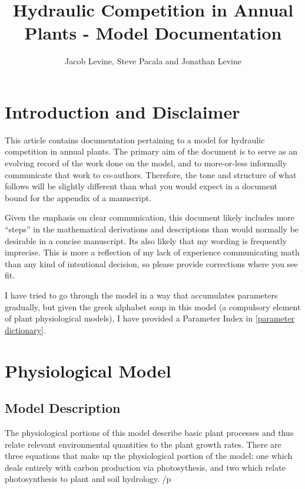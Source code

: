 \documentclass{article}
\title{Hydraulic Competition in Annual Plants - Model Documentation}
\author{Jacob Levine, Steve Pacala and Jonathan Levine}
\date{}
\begin{document}
\maketitle

  \tableofcontents

  \section{Introduction and Disclaimer}

  This article contains documentation pertaining to a model for hydraulic
  competition in annual plants. The primary aim of the document is to serve as an
  evolving record of the work done on the model, and to more-or-less
  informally communicate that work to co-authors. Therefore, the tone and
  structure of what follows will be slightly different than what you would
  expect in a document bound for the appendix of a manuscript. \p

  Given the emphasis on clear communication, this document likely
  includes more ``steps'' in the mathematical derivations and descriptions than
  would normally be desirable in a concise manuscript. Its also likely that my
  wording is frequently imprecise. This is more a reflection of my lack of
  experience communicating math than any kind of intentional
  decision, so please provide corrections where you see fit. \p

  I have tried to go through the model in a way that accumulates parameters gradually, but
  given the greek alphabet soup in this model (a compulsory element of plant
  physiological models), I have provided a Parameter Index in \ref{parameter dictionary}.

  \section{Physiological Model}

  \subsection{Model Description} \label{model description}

  The physiological portions of this model describe basic plant processes and
  thus relate relevant environmental quantities to the plant growth rates. There
  are three equations that make up the physiological portion of the model: one
  which deals entirely with carbon production via photosythesis, and two
  which relate photosynthesis to plant and soil hydrology. /p
\end{document}
